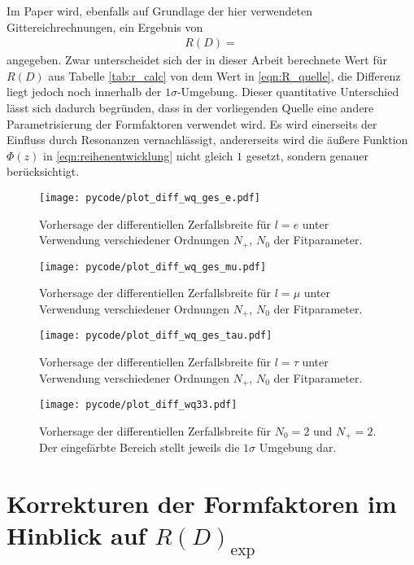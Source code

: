 Im Paper \cite{PhysRevD.92.034506} wird, ebenfalls auf Grundlage der hier verwendeten Gittereichrechnungen, ein Ergebnis von
\begin{align}
  \label{eqn:R_quelle}
  R(D) = 
\end{align}
angegeben.
Zwar unterscheidet sich der in dieser Arbeit berechnete Wert für $R(D)$ aus Tabelle \ref{tab:r_calc} von dem Wert in \eqref{eqn:R_quelle}, die Differenz liegt jedoch noch innerhalb der $\num{1}\sigma$-Umgebung.
Dieser quantitative Unterschied lässt sich dadurch begründen, dass in der vorliegenden Quelle eine andere Parametrisierung der Formfaktoren verwendet wird.
Es wird einerseits der Einfluss durch Resonanzen vernachlässigt, andererseits wird die äußere Funktion $\Phi(z)$ in \eqref{eqn:reihenentwicklung} nicht gleich $1$ gesetzt, sondern genauer berücksichtigt.

\begin{figure}
  \centering
  \texttt{[image: pycode/plot\_diff\_wq\_ges\_e.pdf]}
  \caption{Vorhersage der differentiellen Zerfallsbreite für $l=e$ unter Verwendung verschiedener Ordnungen $N_+$, $N_0$ der Fitparameter.}
  \label{fig:difwqe}
\end{figure}
\begin{figure}
  \centering
  \texttt{[image: pycode/plot\_diff\_wq\_ges\_mu.pdf]}
  \caption{Vorhersage der differentiellen Zerfallsbreite für $l=\mu$ unter Verwendung verschiedener Ordnungen $N_+$, $N_0$ der Fitparameter.}
  \label{fig:difwqmu}
\end{figure}
\begin{figure}
  \centering
  \texttt{[image: pycode/plot\_diff\_wq\_ges\_tau.pdf]}
  \caption{Vorhersage der differentiellen Zerfallsbreite für $l=\tau$ unter Verwendung verschiedener Ordnungen $N_+$, $N_0$ der Fitparameter.}
  \label{fig:difwqtau}
\end{figure}
\begin{figure}
  \centering
  \texttt{[image: pycode/plot\_diff\_wq33.pdf]}
  \caption{Vorhersage der differentiellen Zerfallsbreite für $N_0 = \num{2}$ und $N_+ = \num{2}$. Der eingefärbte Bereich stellt jeweils die $\num{1}\sigma$ Umgebung dar.}
  \label{fig:difwq33}
\end{figure}

\section{Korrekturen der Formfaktoren im Hinblick auf \texorpdfstring{$R(D)_\text{exp}$}{R(D)_exp}}


